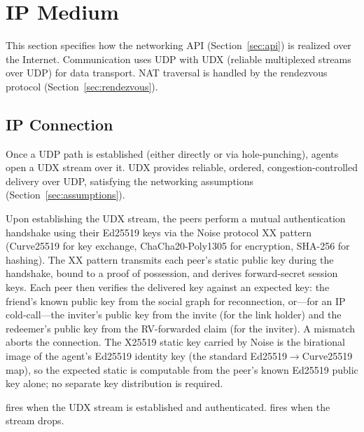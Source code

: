 \section{IP Medium}
\label{sec:ip}
This section specifies how the networking API (Section~\ref{sec:api}) is realized over the Internet.  Communication uses UDP with UDX (reliable multiplexed streams over UDP) for data transport.  NAT traversal is handled by the rendezvous protocol (Section~\ref{sec:rendezvous}).

\subsection{IP Connection}
\label{sec:ip-connection}
Once a UDP path is established (either directly or via hole-punching), agents open a UDX stream over it. UDX provides reliable, ordered, congestion-controlled delivery over UDP, satisfying the networking assumptions (Section~\ref{sec:assumptions}).

Upon establishing the UDX stream, the peers perform a mutual authentication handshake using their Ed25519 keys via the Noise protocol XX pattern (Curve25519 for key exchange, ChaCha20-Poly1305 for encryption, SHA-256 for hashing).  The XX pattern transmits each peer's static public key during the handshake, bound to a proof of possession, and derives forward-secret session keys.  Each peer then verifies the delivered key against an expected key: the friend's known public key from the social graph for reconnection, or---for an IP cold-call---the inviter's public key from the invite (for the link holder) and the redeemer's public key from the RV-forwarded claim (for the inviter).  A mismatch aborts the connection.  The X25519 static key carried by Noise is the birational image of the agent's Ed25519 identity key (the standard Ed25519$\to$Curve25519 map), so the expected static is computable from the peer's known Ed25519 public key alone; no separate key distribution is required. 

 fires when the UDX stream is established and authenticated.  fires when the stream drops.

